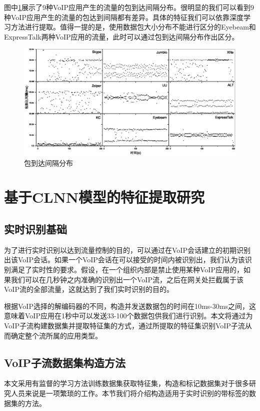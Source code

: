 图中\ref{fig:itd}展示了9种VoIP应用产生的流量的包到达间隔分布。很明显的我们可以看到9种VoIP应用产生的流量的包达到间隔都有差异。具体的特征我们可以依靠深度学习方法进行提取。值得一提的是，使用数据包大小分布不能进行区分的Eyebeam和ExpressTalk两种VoIP应用的流量，此时可以通过包到达间隔分布作出区分。


\begin{figure}[thb]
\begin{center}
\includegraphics[width=1\textwidth]{figures/itd.eps}
\caption{包到达间隔分布}\label{fig:itd}
\end{center}
\end{figure}

\section{基于CLNN模型的特征提取研究}
\subsection{实时识别基础}
为了进行实时识别以达到流量控制的目的，可以通过在VoIP会话建立的初期识别出该VoIP会话。如果一个VoIP会话在可以接受的时间内被识别出，我们认为该识别满足了实时性的要求。假设，在一个组织内部是禁止使用某种VoIP应用的，如果我们可以在几秒钟之内准确的识别出一个VoIP流，之后在网关处拦截属于该VoIP流的全部流量，这就达到了我们实时识别的目的。

根据VoIP选择的解编码器的不同，构造并发送数据包的时间在10ms-30ms之间，这意味着VoIP应用在1秒中可以发送33-100个数据包供我们进行识别。本文将通过为VoIP子流构建数据集并提取特征集的方式，通过所提取的特征集识别VoIP子流从而确定整个流所属的应用类型。

\subsection{VoIP子流数据集构造方法}
本文采用有监督的学习方法训练数据集获取特征集，构造和标记数据集对于很多研究人员来说是一项繁琐的工作。本节我们将介绍构造适用于实时识别的带标签的数据集的方法。
